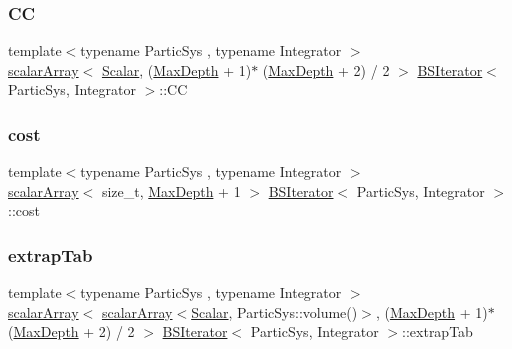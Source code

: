 \subsubsection{\texorpdfstring{CC}{CC}}
{\footnotesize\ttfamily template$<$typename Partic\+Sys , typename Integrator $>$ \\
\mbox{\hyperlink{class_b_s_iterator_ab0aa7c10b56500273af05dcd85fd8389}{scalar\+Array}}$<$ \mbox{\hyperlink{class_b_s_iterator_a7857f8ff9032955ea4dcc22cd18ca7a1}{Scalar}}, (\mbox{\hyperlink{class_b_s_iterator_a39409b9a12d4854d101ce59a0efc0f74}{Max\+Depth}} + 1)$\ast$ (\mbox{\hyperlink{class_b_s_iterator_a39409b9a12d4854d101ce59a0efc0f74}{Max\+Depth}} + 2) / 2 $>$ \mbox{\hyperlink{class_b_s_iterator}{B\+S\+Iterator}}$<$ Partic\+Sys, Integrator $>$\+::CC\hspace{0.3cm}{\ttfamily [private]}}

\mbox{\label{class_b_s_iterator_a53f435811c23c0ae1713df13197fc9c9}} 
\subsubsection{\texorpdfstring{cost}{cost}}
{\footnotesize\ttfamily template$<$typename Partic\+Sys , typename Integrator $>$ \\
\mbox{\hyperlink{class_b_s_iterator_ab0aa7c10b56500273af05dcd85fd8389}{scalar\+Array}}$<$ size\+\_\+t, \mbox{\hyperlink{class_b_s_iterator_a39409b9a12d4854d101ce59a0efc0f74}{Max\+Depth}} + 1 $>$ \mbox{\hyperlink{class_b_s_iterator}{B\+S\+Iterator}}$<$ Partic\+Sys, Integrator $>$\+::cost\hspace{0.3cm}{\ttfamily [private]}}

\mbox{\label{class_b_s_iterator_aa501e973f342248fc445d59a5166ccc9}} 
\subsubsection{\texorpdfstring{extrap\+Tab}{extrapTab}}
{\footnotesize\ttfamily template$<$typename Partic\+Sys , typename Integrator $>$ \\
\mbox{\hyperlink{class_b_s_iterator_ab0aa7c10b56500273af05dcd85fd8389}{scalar\+Array}}$<$ \mbox{\hyperlink{class_b_s_iterator_ab0aa7c10b56500273af05dcd85fd8389}{scalar\+Array}}$<$\mbox{\hyperlink{class_b_s_iterator_a7857f8ff9032955ea4dcc22cd18ca7a1}{Scalar}}, Partic\+Sys\+::volume()$>$, (\mbox{\hyperlink{class_b_s_iterator_a39409b9a12d4854d101ce59a0efc0f74}{Max\+Depth}} + 1)$\ast$ (\mbox{\hyperlink{class_b_s_iterator_a39409b9a12d4854d101ce59a0efc0f74}{Max\+Depth}} + 2) / 2 $>$ \mbox{\hyperlink{class_b_s_iterator}{B\+S\+Iterator}}$<$ Partic\+Sys, Integrator $>$\+::extrap\+Tab\hspace{0.3cm}{\ttfamily [private]}}

